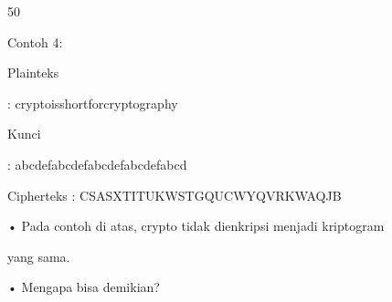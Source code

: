 \documentclass{article}
\begin{document}

50

Contoh 4:

Plainteks 

: cryptoisshortforcryptography

Kunci  

: abcdefabcdefabcdefabcdefabcd

Cipherteks : CSASXTITUKWSTGQUCWYQVRKWAQJB

• Pada contoh di atas, crypto tidak dienkripsi menjadi kriptogram 

yang sama. 

• Mengapa bisa demikian?
\end{document}
